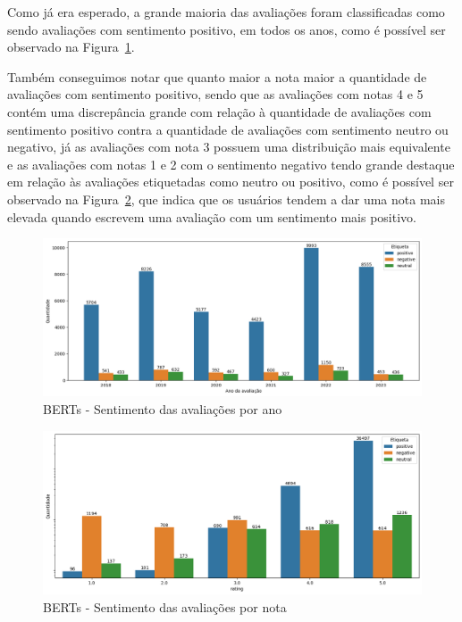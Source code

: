 Como já era esperado, a grande maioria das avaliações foram classificadas como sendo avaliações com sentimento positivo, em todos os anos, como é possível ser observado na Figura~\ref{img:sentimento_timechart_bert}.

Também conseguimos notar que quanto maior a nota maior a quantidade de avaliações com sentimento positivo, sendo que as avaliações com notas 4 e 5 contém uma discrepância grande com relação à quantidade de avaliações com sentimento positivo contra a quantidade de avaliações com sentimento neutro ou negativo, já as avaliações com nota 3 possuem uma distribuição mais equivalente e as avaliações com notas 1 e 2 com o sentimento negativo tendo grande destaque em relação às avaliações etiquetadas como neutro ou positivo, como é possível ser observado na Figura~\ref{img:sentimento_nota_bert}, que indica que os usuários tendem a dar uma nota mais elevada quando escrevem uma avaliação com um sentimento mais positivo.

\begin{figure}
	\centering
	\includegraphics[width=1\textwidth]{figs/bert/sentimento_ano.png}
	\caption{BERTs - Sentimento das avaliações por ano}
	\label{img:sentimento_timechart_bert}
\end{figure}

\begin{figure}
	\centering
	\includegraphics[width=1\textwidth]{figs/bert/sentimento_nota.png}
	\caption{BERTs - Sentimento das avaliações por nota}
	\label{img:sentimento_nota_bert}
\end{figure}

